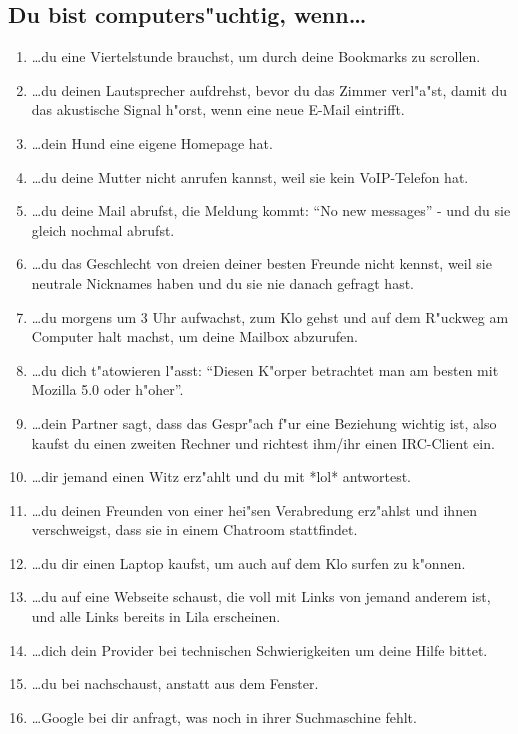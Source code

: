 \subsection*{\Large{Du bist computers"uchtig, wenn\ldots}}

\begin{enumerate}
\item \ldots du eine Viertelstunde brauchst, um durch deine Bookmarks zu scrollen.
\item \ldots du deinen Lautsprecher aufdrehst, bevor du das Zimmer verl"a"st, damit du das akustische Signal h"orst, wenn eine neue E-Mail eintrifft.
\item \ldots dein Hund eine eigene Homepage hat.
\item \ldots du deine Mutter nicht anrufen kannst, weil sie kein VoIP-Telefon hat.
\item \ldots du deine Mail abrufst, die Meldung kommt: "`No new messages"' - und du sie gleich nochmal abrufst.
\item \ldots du das Geschlecht von dreien deiner besten Freunde nicht kennst, weil sie neutrale Nicknames haben und du sie nie danach gefragt hast.
\item \ldots du morgens um 3 Uhr aufwachst, zum Klo gehst und auf dem R"uckweg am Computer halt machst, um deine Mailbox abzurufen.
\item \ldots du dich t"atowieren l"asst: "`Diesen K"orper betrachtet man am besten mit Mozilla 5.0 oder h"oher"'.
\item \ldots dein Partner sagt, dass das Gespr"ach f"ur eine Beziehung wichtig ist, also kaufst du einen zweiten Rechner und richtest ihm/ihr einen IRC-Client ein.
\item \ldots dir jemand einen Witz erz"ahlt und du mit *lol* antwortest.
\item \ldots du deinen Freunden von einer hei"sen Verabredung erz"ahlst und ihnen verschweigst, dass sie in einem Chatroom stattfindet.
\item \ldots du dir einen Laptop kaufst, um auch auf dem Klo surfen zu k"onnen.
\item \ldots du auf eine Webseite schaust, die voll mit Links von jemand anderem ist, und alle Links bereits in Lila erscheinen.
\item \ldots dich dein Provider bei technischen Schwierigkeiten um deine Hilfe bittet.
\item \ldots du bei  nachschaust, anstatt aus dem Fenster.
\item \ldots Google bei dir anfragt, was noch in ihrer Suchmaschine fehlt.

\end{enumerate}
